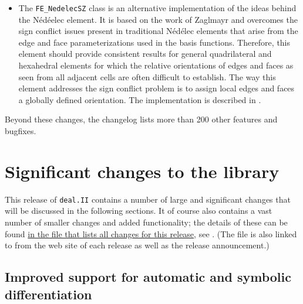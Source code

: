 \documentclass{ansarticle-preprint}
\newcommand{\specialword}[1]{\texttt{#1}}
\newcommand{\dealii}{{\specialword{deal.II}}\xspace}
\begin{document}
\begin{itemize}
\item The \texttt{FE\_NedelecSZ} class is an alternative
  implementation of the ideas behind the N{\'e}d{\'e}elec element. It is based
  on the work of Zaglmayr \cite{Zag06} and overcomes the
  sign conflict issues present in traditional N{\'e}d{\'e}lec
  elements that arise from the edge and face parameterizations used
  in the basis functions. Therefore, this element should provide
  consistent results for general quadrilateral and hexahedral
  elements for which the relative orientations of edges and faces as
  seen from all adjacent cells are often difficult to establish.
  The way this element addresses the sign conflict problem is to assign
  local edges and faces a globally defined orientation. The
  implementation is described in \cite{Kynch2017}.

\end{itemize}

Beyond these changes, the changelog lists more than 200 other features and bugfixes.




\section{Significant changes to the library}

This release of \dealii contains a number of large and significant changes
that will be discussed in the following sections. It of course also contains a
vast number of smaller changes and added functionality; the details of these
can be found
\href{https://dealii.org/developer/doxygen/deal.II/changes_between_9_0_1_and_9_1_0.html}{
in the file that lists all changes for this release}, see \cite{changes91}.
(The file is also linked to from the web site of each release as well as
the release announcement.)


\subsection{Improved support for automatic and symbolic differentiation}

\end{document}
